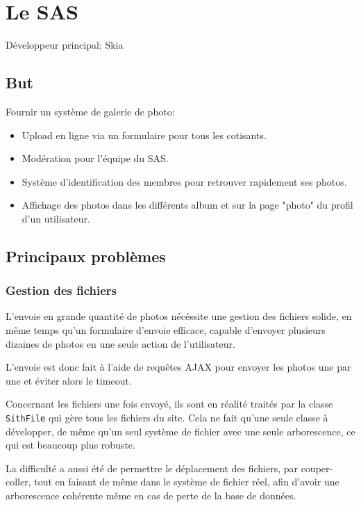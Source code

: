 \documentclass[a4paper]{report}
\begin{document}
\chapter{Le SAS}
\label{sec:le_sas}
\par Développeur principal: Skia

\section{But}
\label{sub:but}
\par Fournir un système de galerie de photo:
\begin{itemize}
    \item Upload en ligne via un formulaire pour tous les cotisants.
    \item Modération pour l'équipe du SAS.
    \item Système d'identification des membres pour retrouver rapidement ses photos.
    \item Affichage des photos dans les différents album et sur la page "photo" du profil d'un utilisateur.
\end{itemize}

\section{Principaux problèmes}
\label{sec:principaux_problemes}

\subsection{Gestion des fichiers}
\label{sub:gestion_des_fichiers}
\par L'envoie en grande quantité de photos nécéssite une gestion des fichiers solide, en même temps qu'un formulaire
d'envoie efficace, capable d'envoyer plusieurs dizaines de photos en une seule action de l'utilisateur.

\par L'envoie est donc fait à l'aide de requêtes AJAX pour envoyer les photos une par une et éviter alors le timeout.

\par Concernant les fichiers une fois envoyé, ils sont en réalité traités par la classe \verb#SithFile# qui gère tous
les fichiers du site. Cela ne fait qu'une seule classe à développer, de même qu'un seul système de fichier avec une
seule arborescence, ce qui est beaucoup plus robuste.

\par La difficulté a aussi été de permettre le déplacement des fichiers, par couper-coller, tout en faisant de même dans
le système de fichier réel, afin d'avoir une arborescence cohérente même en cas de perte de la base de données.
\end{document}
